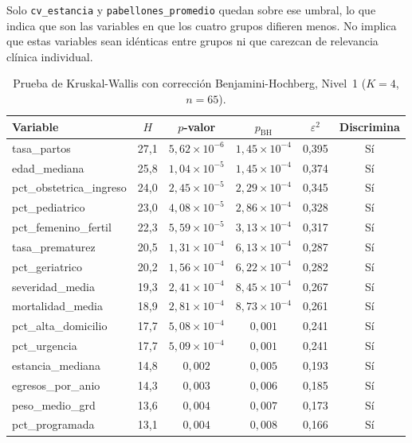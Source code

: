 Solo \texttt{cv\_estancia} y \texttt{pabellones\_promedio} quedan sobre ese umbral, lo que indica que son las variables en que los cuatro grupos difieren menos. No implica que estas variables sean idénticas entre grupos ni que carezcan de relevancia clínica individual.

\begin{table}[htbp]
\centering
\caption{Prueba de Kruskal-Wallis con corrección Benjamini-Hochberg, Nivel~1 ($K=4$, $n=65$).}
\label{tab:kruskal-nivel1}

\begin{tabular}{l c c c c c}
\toprule
\textbf{Variable} & \textbf{$H$} & \textbf{$p$-valor} &
\textbf{$p_{\text{BH}}$} & \textbf{$\varepsilon^2$} &
\textbf{Discrimina} \\
\midrule
tasa\_partos
& 27,1 & $5{,}62 \times 10^{-6}$ & $1{,}45 \times 10^{-4}$ & 0,395 & Sí \\
edad\_mediana
& 25,8 & $1{,}04 \times 10^{-5}$ & $1{,}45 \times 10^{-4}$ & 0,374 & Sí \\
pct\_obstetrica\_ingreso
& 24,0 & $2{,}45 \times 10^{-5}$ & $2{,}29 \times 10^{-4}$ & 0,345 & Sí \\
pct\_pediatrico
& 23,0 & $4{,}08 \times 10^{-5}$ & $2{,}86 \times 10^{-4}$ & 0,328 & Sí \\
pct\_femenino\_fertil
& 22,3 & $5{,}59 \times 10^{-5}$ & $3{,}13 \times 10^{-4}$ & 0,317 & Sí \\
tasa\_prematurez
& 20,5 & $1{,}31 \times 10^{-4}$ & $6{,}13 \times 10^{-4}$ & 0,287 & Sí \\
pct\_geriatrico
& 20,2 & $1{,}56 \times 10^{-4}$ & $6{,}22 \times 10^{-4}$ & 0,282 & Sí \\
severidad\_media
& 19,3 & $2{,}41 \times 10^{-4}$ & $8{,}45 \times 10^{-4}$ & 0,267 & Sí \\
mortalidad\_media
& 18,9 & $2{,}81 \times 10^{-4}$ & $8{,}73 \times 10^{-4}$ & 0,261 & Sí \\
pct\_alta\_domicilio
& 17,7 & $5{,}08 \times 10^{-4}$ & $0{,}001$ & 0,241 & Sí \\
pct\_urgencia
& 17,7 & $5{,}09 \times 10^{-4}$ & $0{,}001$ & 0,241 & Sí \\
estancia\_mediana
& 14,8 & $0{,}002$ & $0{,}005$ & 0,193 & Sí \\
egresos\_por\_anio
& 14,3 & $0{,}003$ & $0{,}006$ & 0,185 & Sí \\
peso\_medio\_grd
& 13,6 & $0{,}004$ & $0{,}007$ & 0,173 & Sí \\
pct\_programada
& 13,1 & $0{,}004$ & $0{,}008$ & 0,166 & Sí \\

\end{tabular}
\end{table}
